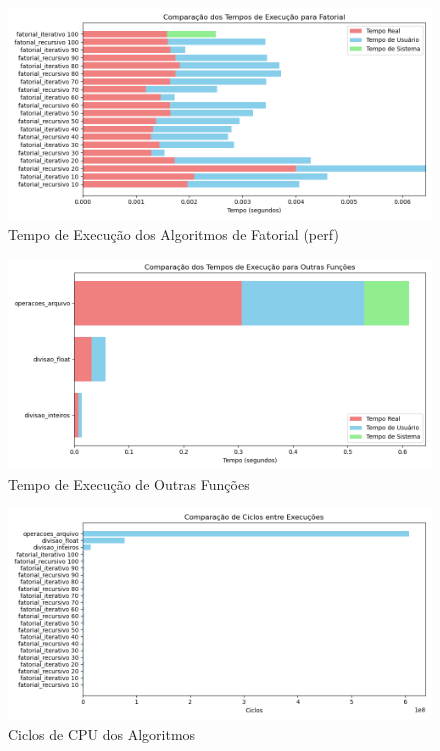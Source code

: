 \documentclass[12pt]{article}
\begin{document}
\begin{figure}[H]
    \centering
    \includegraphics[width=\linewidth]{resultados/tempo_execucao_fatorial.png}
    \caption{Tempo de Execução dos Algoritmos de Fatorial (perf)}
    \label{fig:tempo_execucao}
\end{figure}

\begin{figure}[H]
    \centering
    \includegraphics[width=\linewidth]{resultados/tempo_execucao_outras.png}
    \caption{Tempo de Execução de Outras Funções}
    \label{fig:tempo_execucao_outras}
\end{figure}

\begin{figure}[H]
    \centering
    \includegraphics[width=\linewidth]{resultados/cycles.png}
    \caption{Ciclos de CPU dos Algoritmos}
    \label{fig:ciclos_cpu}
\end{figure}
\end{document}
